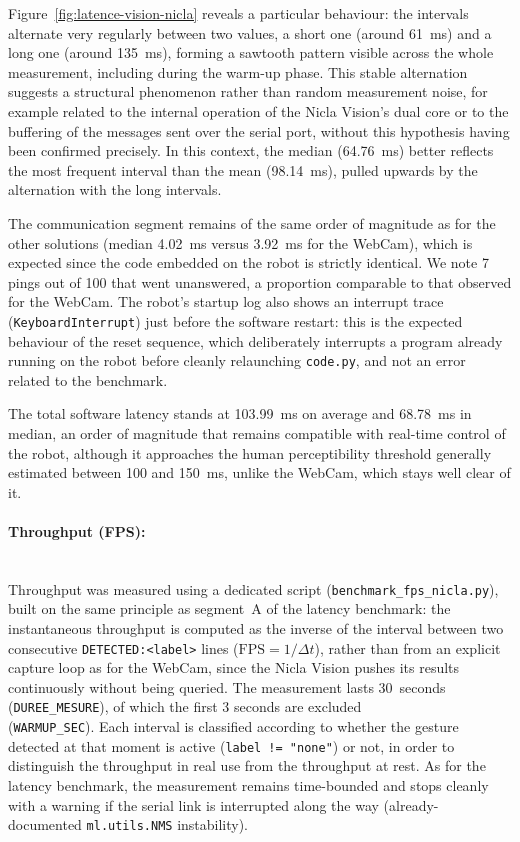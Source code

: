 \documentclass[12pt,a4paper]{report}
\begin{document}
	Figure~\ref{fig:latence-vision-nicla} reveals a particular behaviour: the intervals alternate very regularly between two values, a short one (around 61~ms) and a long one (around 135~ms), forming a sawtooth pattern visible across the whole measurement, including during the warm-up phase. This stable alternation suggests a structural phenomenon rather than random measurement noise, for example related to the internal operation of the Nicla Vision's dual core or to the buffering of the messages sent over the serial port, without this hypothesis having been confirmed precisely. In this context, the median (64.76~ms) better reflects the most frequent interval than the mean (98.14~ms), pulled upwards by the alternation with the long intervals.
	
	The communication segment remains of the same order of magnitude as for the other solutions (median 4.02~ms versus 3.92~ms for the WebCam), which is expected since the code embedded on the robot is strictly identical. We note 7 pings out of 100 that went unanswered, a proportion comparable to that observed for the WebCam. The robot's startup log also shows an interrupt trace (\texttt{KeyboardInterrupt}) just before the software restart: this is the expected behaviour of the reset sequence, which deliberately interrupts a program already running on the robot before cleanly relaunching \texttt{code.py}, and not an error related to the benchmark.
	
	The total software latency stands at 103.99~ms on average and 68.78~ms in median, an order of magnitude that remains compatible with real-time control of the robot, although it approaches the human perceptibility threshold generally estimated between 100 and 150~ms, unlike the WebCam, which stays well clear of it.
	
	
	\paragraph{Throughput (FPS):} \mbox{} \\
	Throughput was measured using a dedicated script (\texttt{benchmark\_fps\_nicla.py}), built on the same principle as segment~A of the latency benchmark: the instantaneous throughput is computed as the inverse of the interval between two consecutive \texttt{DETECTED:<label>} lines ($\text{FPS} = 1/\Delta t$), rather than from an explicit capture loop as for the WebCam, since the Nicla Vision pushes its results continuously without being queried. The measurement lasts 30~seconds (\texttt{DUREE\_MESURE}), of which the first 3 seconds are excluded \\ (\texttt{WARMUP\_SEC}). Each interval is classified according to whether the gesture detected at that moment is active (\texttt{label != "none"}) or not, in order to distinguish the throughput in real use from the throughput at rest. As for the latency benchmark, the measurement remains time-bounded and stops cleanly with a warning if the serial link is interrupted along the way (already-documented \texttt{ml.utils.NMS} instability).
	
\end{document}
